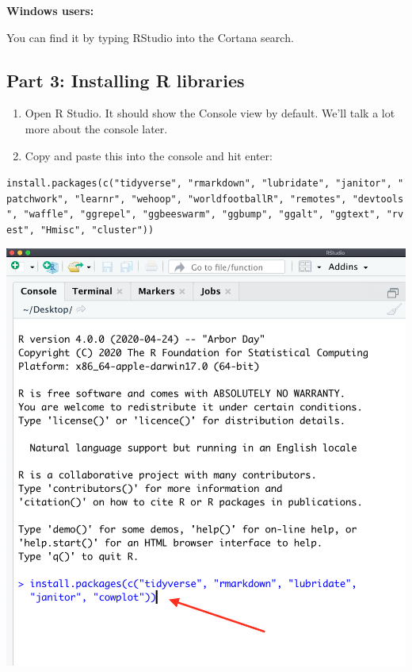 \documentclass[
  letterpaper,
  DIV=11,
  numbers=noendperiod]{scrreprt}
\providecommand{\tightlist}{%
  \setlength{\itemsep}{0pt}\setlength{\parskip}{0pt}}\usepackage{longtable,booktabs,array}
\begin{document}
\textbf{Windows users:}

You can find it by typing RStudio into the Cortana search.

\hypertarget{part-3-installing-r-libraries}{%
\subsection{Part 3: Installing R
libraries}\label{part-3-installing-r-libraries}}

\begin{enumerate}
\def\labelenumi{\arabic{enumi}.}
\tightlist
\item
  Open R Studio. It should show the Console view by default. We'll talk
  a lot more about the console later.
\item
  Copy and paste this into the console and hit enter:
\end{enumerate}

\texttt{install.packages(c("tidyverse",\ "rmarkdown",\ "lubridate",\ "janitor",\ "patchwork",\ "learnr",\ "wehoop",\ "worldfootballR",\ "remotes",\ "devtools",\ "waffle",\ "ggrepel",\ "ggbeeswarm",\ "ggbump",\ "ggalt",\ "ggtext",\ "rvest",\ "Hmisc",\ "cluster"))}

\includegraphics{./images/Screen Shot 2020-07-30 at 6.30.16 PM.png}
\end{document}
